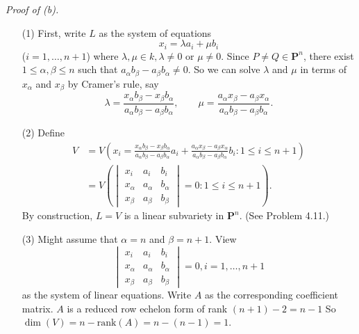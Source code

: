 \documentclass{article}
\begin{document}
\emph{Proof of (b).}
\begin{enumerate}
\item[(1)]
  First, write $L$ as the system of equations
  \[
    x_i = \lambda a_i + \mu b_i
  \]
  ($i = 1, \ldots, n+1$)
  where $\lambda, \mu \in k, \lambda \neq 0 \text{ or } \mu \neq 0$.
  Since $P \neq Q \in \mathbf{P}^n$, there exist $1 \leq \alpha, \beta \leq n$
  such that $a_\alpha b_\beta - a_\beta b_\alpha \neq 0$.
  So we can solve $\lambda$ and $\mu$ in terms of $x_\alpha$ and $x_\beta$ by Cramer's rule,
  say
  \[
    \lambda = \frac{x_\alpha b_\beta - x_\beta b_\alpha}{a_\alpha b_\beta - a_\beta b_\alpha},
    \qquad
    \mu = \frac{a_\alpha x_\beta - a_\beta x_\alpha}{a_\alpha b_\beta - a_\beta b_\alpha}.
  \]

\item[(2)]
  Define
  \begin{align*}
    V
    &= V\left(
      x_i = \frac{x_\alpha b_\beta - x_\beta b_\alpha}{a_\alpha b_\beta - a_\beta b_\alpha} a_i
        + \frac{a_\alpha x_\beta - a_\beta x_\alpha}{a_\alpha b_\beta - a_\beta b_\alpha} b_i
      : 1 \leq i \leq n+1 \right) \\
    &= V\left(
        \begin{vmatrix}
          x_i      & a_i      & b_i      \\
          x_\alpha & a_\alpha & b_\alpha \\
          x_\beta  & a_\beta  & b_\beta
        \end{vmatrix} = 0 : 1 \leq i \leq n+1
      \right).
  \end{align*}
  By construction, $L = V$ is a linear subvariety in $\mathbf{P}^n$. (See Problem 4.11.)

\item[(3)]
  Might assume that $\alpha = n$ and $\beta = n+1$.
  View
  \[
    \begin{vmatrix}
      x_i      & a_i      & b_i      \\
      x_\alpha & a_\alpha & b_\alpha \\
      x_\beta  & a_\beta  & b_\beta
    \end{vmatrix} = 0, i = 1, \ldots, n+1
  \]
  as the system of linear equations.
  Write $A$ as the corresponding coefficient matrix.
  $A$ is a reduced row echelon form of rank $(n+1)-2 = n-1$
  So $\dim(V) = n - \mathrm{rank}(A) = n - (n-1) = 1$.


\end{enumerate}
\end{document}
